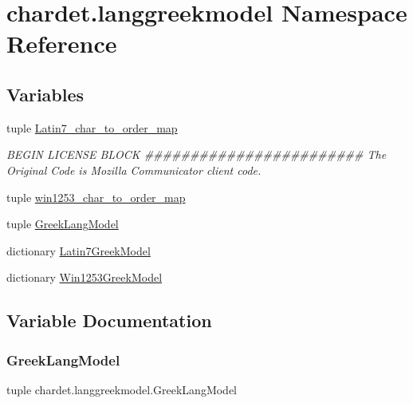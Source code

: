 \hypertarget{namespacechardet_1_1langgreekmodel}{}\section{chardet.\+langgreekmodel Namespace Reference}
\label{namespacechardet_1_1langgreekmodel}
\subsection*{Variables}
\begin{DoxyCompactItemize}
\item 
tuple \hyperlink{namespacechardet_1_1langgreekmodel_adbbf878802f9d7b481a6e8ffdddbdac8}{Latin7\+\_\+char\+\_\+to\+\_\+order\+\_\+map}
\begin{DoxyCompactList}\small\item\em B\+E\+G\+IN L\+I\+C\+E\+N\+SE B\+L\+O\+CK \#\#\#\#\#\#\#\#\#\#\#\#\#\#\#\#\#\#\#\#\#\#\#\# The Original Code is Mozilla Communicator client code. \end{DoxyCompactList}\item 
tuple \hyperlink{namespacechardet_1_1langgreekmodel_a8152d3e3cd169f83e5127973bf4635a7}{win1253\+\_\+char\+\_\+to\+\_\+order\+\_\+map}
\item 
tuple \hyperlink{namespacechardet_1_1langgreekmodel_ab1099626ebf972029d69a050cb113fcb}{Greek\+Lang\+Model}
\item 
dictionary \hyperlink{namespacechardet_1_1langgreekmodel_a75e86bfe2b8e9fe96bcfbdb96850486b}{Latin7\+Greek\+Model}
\item 
dictionary \hyperlink{namespacechardet_1_1langgreekmodel_a3aae4e708215c638147d0f4ddaa8e48a}{Win1253\+Greek\+Model}
\end{DoxyCompactItemize}


\subsection{Variable Documentation}
\mbox{\label{namespacechardet_1_1langgreekmodel_ab1099626ebf972029d69a050cb113fcb}} 
\subsubsection{\texorpdfstring{Greek\+Lang\+Model}{GreekLangModel}}
{\footnotesize\ttfamily tuple chardet.\+langgreekmodel.\+Greek\+Lang\+Model}

